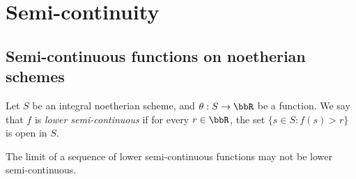 \section{Semi-continuity}


\subsection{Semi-continuous functions on noetherian schemes}

  Let $S$ be an integral noetherian scheme, and $\theta: S \to \bbR$ be a function.
  We say that $f$ is \emph{lower semi-continuous} if for every $r \in \bbR$, the set $\{ s \in S : f(s) > r \}$ is open in $S$.


  \begin{remark}
    The limit of a sequence of lower semi-continuous functions may not be lower semi-continuous. 
    \Yang{}
  \end{remark}